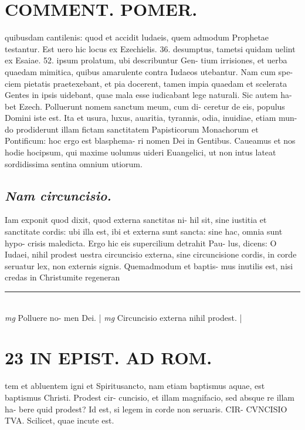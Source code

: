 \documentclass{article}
\begin{document}
\begin{pages}
\section*{COMMENT. POMER.  }\pstart quibusdam cantilenis: quod et accidit ludaeis, quem admodum Prophetae testantur. Est uero hic locus ex Ezechielis. 36. desumptus, tametsi quidam uelint ex Esaiae. 52. ipsum prolatum, ubi describuntur Gen- tium irrisiones, et uerba quaedam mimitica, quibus amarulente contra Iudaeos utebantur. Nam cum spe- ciem pietatis praetexebant, et pia docerent, tamen impia quaedam et scelerata Gentes in ipsis uidebant, quae mala esse iudicabant lege naturali. Sic autem ha- bet Ezech. Polluerunt nomem sanctum meum, cum di- ceretur de eis, populus Domini iste est. Ita et usura, luxus, auaritia, tyrannis, odia, inuidiae, etiam mun- do prodiderunt illam fictam sanctitatem Papisticorum Monachorum et Pontificum: hoc ergo est blasphema- ri nomen Dei in Gentibus. Caueamus et nos hodie hocipsum, qui maxime uolumus uideri Euangelici, ut non intus lateat sordidissima sentina omnium utiorum.   \pend
{}
{}
\subsection*{\textit{Nam circuncisio. }}\pstart Iam exponit quod dixit, quod externa sanctitas ni- hil sit, sine iustitia et sanctitate cordis: ubi illa est, ibi et externa sunt sancta: sine hac, omnia sunt hypo- crisis maledicta. Ergo hic eis supercilium detrahit Pau- lus, dicens: O Iudaei, nihil prodest uestra circuncisio externa, sine circuncisione cordis, in corde seruatur lex, non externis signis. Quemadmodum et baptis- mus inutilis est, nisi credas in Christumite regeneran  \pend
\vspace{0.5cm}\noindent
\vspace{0.2cm}\rule{1cm}{0.2pt}\\ 
\hspace{0.2cm}\textit{mg}
\footnotesize Polluere no- men Dei. 
\normalsize| 
\hspace{0.2cm}\textit{mg}
\footnotesize Circuncisio externa nihil prodest.  
\normalsize| 
\section*{23 IN EPIST. AD ROM.  }
\marginpar{[ p.]}\pstart tem et abluentem igni et Spiritusancto, nam etiam baptismus aquae, est baptismus Christi. Prodest cir- cuncisio, et illam magnifacio, sed absque re illam ha- bere quid prodest?  \pend\pstart Id est, si legem in corde non seruaris. CIR- CVNCISIO TVA. Scilicet, quae incute est.   \pend
{}
{}

\end{pages}
\end{document}
